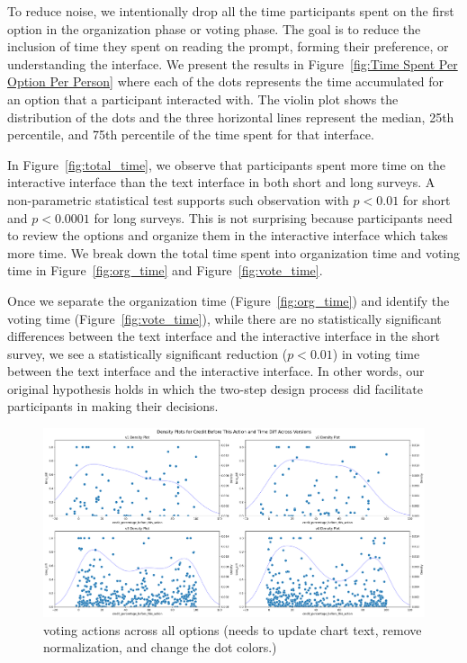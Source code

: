 To reduce noise, we intentionally drop all the time participants spent on the first option in the organization phase or voting phase. The goal is to reduce the inclusion of time they spent on reading the prompt, forming their preference, or understanding the interface. We present the results in Figure~\ref{fig:Time Spent Per Option Per Person} where each of the dots represents the time accumulated for an option that a participant interacted with. The violin plot shows the distribution of the dots and the three horizontal lines represent the median, 25th percentile, and 75th percentile of the time spent for that interface.

In Figure~\ref{fig:total_time}, we observe that participants spent more time on the interactive interface than the text interface in both short and long surveys. A non-parametric statistical test supports such observation with $p<0.01$ for short and $p<0.0001$ for long surveys. This is not surprising because participants need to review the options and organize them in the interactive interface which takes more time. We break down the total time spent into organization time and voting time in Figure~\ref{fig:org_time} and Figure~\ref{fig:vote_time}.

Once we separate the organization time (Figure~\ref{fig:org_time}) and identify the voting time (Figure~\ref{fig:vote_time}), while there are no statistically significant differences between the text interface and the interactive interface in the short survey, we see a statistically significant reduction ($p<0.01$) in voting time between the text interface and the interactive interface. In other words, our original hypothesis holds in which the two-step design process did facilitate participants in making their decisions.

\begin{figure}[h]
    \centering
    \includegraphics[width=\textwidth]{content/image/results/diff_con.png}
    \caption{voting actions across all options (needs to update chart text, remove normalization, and change the dot colors.)}
    \label{fig:voting_all}
\end{figure}


